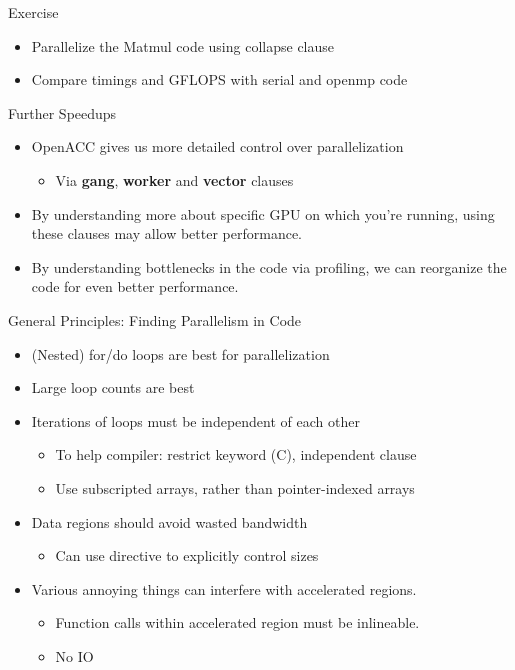 \documentclass[10pt,t]{beamer}
\begin{document}
\begin{frame}{Exercise}
  \begin{itemize}
    \item Parallelize the Matmul code using collapse clause
    \item Compare timings and GFLOPS with serial and openmp code
  \end{itemize}
\end{frame}

\begin{frame}{ Further Speedups}
  \begin{block}{}
    \begin{itemize}
      \item OpenACC gives us more detailed control over parallelization
      \begin{itemize}
        \item Via \textbf{gang}, \textbf{worker} and \textbf{vector} clauses
      \end{itemize}
      \item By understanding more about specific GPU on which you're running, using these clauses may allow better performance.
      \item By understanding bottlenecks in the code via profiling, we can reorganize the code for even better performance.
    \end{itemize}
  \end{block}
\end{frame}

\begin{frame}{ General Principles: Finding Parallelism in Code}
  \begin{itemize}
    \item (Nested) for/do loops are best for parallelization
    \item Large loop counts are best
    \item Iterations of loops must be independent of each other
    \begin{itemize}
      \item To help compiler: restrict keyword (C), independent clause
      \item Use subscripted arrays, rather than pointer-indexed arrays
    \end{itemize}
    \item Data regions should avoid wasted bandwidth
    \begin{itemize}
      \item Can use directive to explicitly control sizes
    \end{itemize}
    \item Various annoying things can interfere with accelerated regions.
    \begin{itemize}
      \item Function calls within accelerated region must be inlineable.
      \item No IO
    \end{itemize}
  \end{itemize}
\end{frame}
\end{document}
